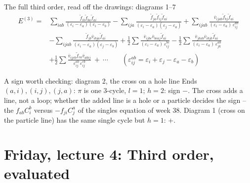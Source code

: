 \documentclass[aspectratio=169,10pt]{beamer}
\newcommand{\vbar}[4]{\overline v_{#1#2#3#4}}
\newcommand{\ftil}[1]{\tilde f_{#1}}
\begin{document}
\begin{frame}[shrink=8]{The full third order, read off the drawings: diagrams 1--7}
\begin{align*}
E^{(3)}
={}& \sum_{iab}\frac{\ftil{ib}\ftil{ba}\ftil{ai}}{(\varepsilon_i-\varepsilon_a)(\varepsilon_i-\varepsilon_b)}
 - \sum_{ija}\frac{\ftil{ja}\ftil{ij}\ftil{ai}}{(\varepsilon_i-\varepsilon_a)(\varepsilon_j-\varepsilon_a)}
 + \sum_{ijab}\frac{\vbar{i}{j}{a}{b}\ftil{bj}\ftil{ai}}{(\varepsilon_i-\varepsilon_a)\,\varepsilon_{ij}^{ab}}\\
&- \sum_{ijab}\frac{\ftil{jb}\vbar{i}{b}{j}{a}\ftil{ai}}{(\varepsilon_i-\varepsilon_a)(\varepsilon_j-\varepsilon_b)}
 + \frac12\sum\frac{\vbar{i}{j}{b}{c}\vbar{b}{c}{a}{j}\ftil{ai}}{(\varepsilon_i-\varepsilon_a)\,\varepsilon_{ij}^{bc}}
 - \frac12\sum\frac{\vbar{j}{k}{a}{b}\vbar{i}{b}{j}{k}\ftil{ai}}{(\varepsilon_i-\varepsilon_a)\,\varepsilon_{jk}^{ab}}\\
&+ \frac12\sum\frac{\vbar{i}{j}{c}{b}\ftil{ca}\vbar{a}{b}{i}{j}}{\varepsilon_{ij}^{ab}\,\varepsilon_{ij}^{cb}}
 \ +\ \cdots\qquad(\varepsilon_{ij}^{ab}=\varepsilon_i+\varepsilon_j-\varepsilon_a-\varepsilon_b)
\end{align*}
\begin{block}{A sign worth checking: diagram 2, the cross on a hole line}
Ends \((a,i),(i,j),(j,a)\): \(\pi\) is one 3-cycle, \(l=1\); \(h=2\): sign \(-\). The cross adds a line, not a loop; whether the added line is a hole or a particle decides the sign -- the \(f_{ab}C_i^b\) versus \(-f_{ji}C_j^a\) of the singles equation of week 38. Diagram 1 (cross on the particle line) has the same single cycle but \(h=1\): \(+\).
\end{block}
\end{frame}

\section{Friday, lecture 4: Third order, evaluated}
\end{document}
